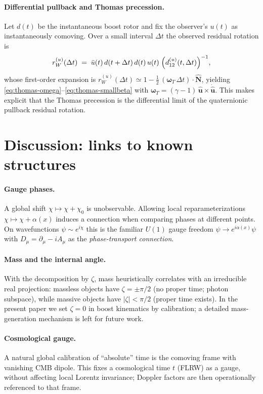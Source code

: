 \documentclass[11pt]{article}
\numberwithin{equation}{section}
\begin{document}
\paragraph{Differential pullback and Thomas precession.}
Let $d(t)$ be the instantaneous boost rotor and fix the observer's $u(t)$ as
instantaneously comoving. Over a small interval $\Delta t$ the observed residual
rotation is
\begin{equation}
r_W^{(u)}(\Delta t)\;=\;
\bar u(t)\, d(t+\Delta t)\,d(t)\, u(t)\; \Bigl(d^{(u)}_{12}(t,\Delta t)\Bigr)^{-1},
\end{equation}
whose first-order expansion is $r_W^{(u)}(\Delta t)\simeq
1-\tfrac{1}{2}\,(\boldsymbol{\omega}_T\,\Delta t)\!\cdot\!\hat{\mathbf N}$, yielding
\eqref{eq:thomas-omega}--\eqref{eq:thomas-smallbeta} with
$\boldsymbol{\omega}_T=(\gamma-1)\,\hat{\mathbf u}\times\dot{\hat{\mathbf u}}$.
This makes explicit that the Thomas precession is the differential limit of the
quaternionic pullback residual rotation.

\section{Discussion: links to known structures}
\paragraph{Gauge phases.} A global shift $\chi\mapsto\chi+\chi_0$ is unobservable. Allowing local reparameterizations $\chi\mapsto\chi+\alpha(x)$ induces a connection when comparing phases at different points. On wavefunctions $\psi\sim e^{i\chi}$ this is the familiar $U(1)$ gauge freedom $\psi\to e^{i\alpha(x)}\psi$ with $D_\mu=\partial_\mu-iA_\mu$ as the \emph{phase-transport connection}.

\paragraph{Mass and the internal angle.} With the decomposition by $\zeta$, mass heuristically correlates with an irreducible real projection: massless objects have $\zeta=\pm\pi/2$ (no proper time; photon subspace), while massive objects have $|\zeta|<\pi/2$ (proper time exists). In the present paper we set $\zeta=0$ in boost kinematics by calibration; a detailed mass-generation mechanism is left for future work.

\paragraph{Cosmological gauge.} A natural global calibration of ``absolute'' time is the comoving frame with vanishing CMB dipole. This fixes a cosmological time $t$ (FLRW) as a gauge, without affecting local Lorentz invariance; Doppler factors are then operationally referenced to that frame.
\end{document}
